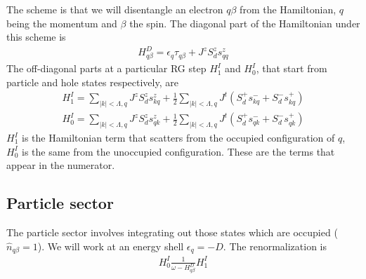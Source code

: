 \documentclass[12pt]{revtex4-2}
\begin{document}
The scheme is that we will disentangle an electron \(q\beta\) from the Hamiltonian, \(q\) being the momentum and \(\beta\) the spin. The diagonal part of the Hamiltonian under this scheme is
\begin{align}
\label{kondodiag}
H^D_{q\beta} = \epsilon_q \tau_{q\beta} + J^z S_d^z s_{qq}^z
\end{align}
The off-diagonal parts at a particular RG step \(H^I_1\) and \(H^I_0\), that start from particle and hole states respectively, are
\begin{align}
	H^I_1 = \sum_{|k|<\Lambda,q} J^z S_d^z s^z_{kq} + \frac{1}{2}\sum_{|k|<\Lambda,q} J^t \left(S_d^+ s^-_{kq} + S_d^- s^+_{kq}\right)\\
	H^I_0 = \sum_{|k|<\Lambda,q} J^z S_d^z s^z_{qk} + \frac{1}{2}\sum_{|k|<\Lambda,q} J^t \left(S_d^+ s^-_{qk}  + S_d^- s^+_{qk}\right)
\end{align}
\(H^I_1\) is the Hamiltonian term that scatters from the occupied configuration of \(q\), \(H^I_0\) is the same from the unoccupied configuration.
These are the terms that appear in the numerator.
\subsection{Particle sector}
The particle sector involves integrating out those states which are occupied (\(\hat n_{q\beta}=1\)). We will work at an energy  shell \(\epsilon_q = -D\). The renormalization is
\begin{align}
	H^I_0 \frac{1}{\omega - H^D_{q\beta}} H^I_1
\end{align}
\end{document}
